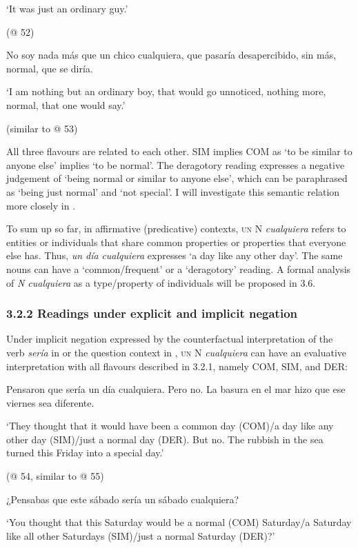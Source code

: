 \documentclass[output=paper]{langscibook}
\begin{document}
  ‘It was just an ordinary guy.’

  (@ 52)

  No soy nada más que un chico cualquiera, que pasaría desapercibido, sin más, normal, que se diría.

  ‘I am nothing but an ordinary boy, that would go unnoticed, nothing more, normal, that one would say.’ 

  (similar to @ 53)

All three flavours are related to each other. SIM implies COM as ‘to be similar to anyone else’ implies ‘to be normal’. The deragotory reading expresses a negative judgement of ‘being normal or similar to anyone else’, which can be paraphrased as ‘being just normal’ and ‘not special’. I will investigate this semantic relation more closely in .

  To sum up so far, in affirmative (predicative) contexts, \textsc{un} N \textit{cualquiera} refers to entities or individuals that share common properties or properties that everyone else has. Thus, \textit{un día} \textit{cualquiera} expresses ‘a day like any other day’. The same nouns can have a ‘common/frequent’ or a ‘deragotory’ reading. A formal analysis of \textit{N cualquiera} as a type/property of individuals will be proposed in 3.6.

\subsubsection{\textbf{3.2.2} \textbf{Readings} \textbf{under} \textbf{explicit} \textbf{and} \textbf{implicit} \textbf{negation}}

Under implicit negation expressed by the counterfactual interpretation of the verb \textit{sería} in  or the question context in , \textsc{un} N \textit{cualquiera} can have an evaluative interpretation with all flavours described in 3.2.1, namely COM, SIM, and DER:

\label{bkm:Ref54634548}  Pensaron que sería un día cualquiera. Pero no. La basura en el mar hizo que ese viernes sea diferente.

  ‘They thought that it would have been a common day (COM)/a day like any other day (SIM)/just a normal day (DER). But no. The rubbish in the sea turned this Friday into a special day.’

  (@ 54, similar to @ 55)

\label{bkm:Ref54634539}  ¿Pensabas que este sábado sería un sábado cualquiera?

  ‘You thought that this Saturday would be a normal (COM) Saturday/a Saturday like all other Saturdays (SIM)/just a normal Saturday (DER)?’
\end{document}
